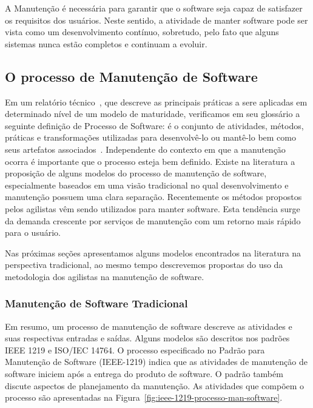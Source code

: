 A Manutenção é necessária para garantir que o software seja capaz de satisfazer
os requisitos dos usuários. Neste sentido, a atividade de manter software pode
ser vista como um desenvolvimento contínuo, sobretudo, pelo fato que alguns
sistemas nunca estão completos e continuam a evoluir.


\subsection{O processo de Manutenção de Software}
\label{sec:o_processo_de_manutecao_de_software}

Em um relatório técnico~\cite{paulk1993key}, que descreve as principais práticas
a sere aplicadas em determinado nível de um modelo de maturidade, verificamos em
seu glossário a seguinte definição de Processo de Software: é o conjunto de
atividades, métodos, práticas e transformações utilizadas para desenvolvê-lo ou
mantê-lo bem como seus artefatos associados~\cite{paulk1993key}. Independente do
contexto em que a manutenção ocorra é importante que o processo esteja bem
definido. Existe na literatura a proposição de alguns modelos do processo de
manutenção de software, especialmente baseados em uma visão tradicional no qual
desenvolvimento e manutenção possuem uma clara separação. Recentemente os
métodos propostos pelos agilistas vêm sendo utilizados para manter software.
Esta tendência surge da demanda crescente por serviços de manutenção com um
retorno mais rápido para o usuário.
\todoend{}

Nas próximas seções apresentamos alguns modelos encontrados na literatura na
perspectiva tradicional, ao mesmo tempo descrevemos propostas do uso da
metodologia dos agilistas na manutenção de software.

\subsubsection{Manutenção de Software Tradicional}
\label{subsec:manutenção_de_software_tradicional}

Em resumo, um processo de manutenção de software descreve as atividades e suas
respectivas entradas e saídas. Alguns modelos são descritos nos padrões IEEE
1219 e ISO/IEC 14764. O processo especificado no Padrão para Manutenção de
Software (IEEE\@-\@1219) indica que as atividades de manutenção de software
iniciem após a entrega do produto de software. O padrão também discute aspectos
de planejamento da manutenção. As atividades que compõem o processo são
apresentadas na Figura~\ref{fig:ieee-1219-processo-man-software}.

